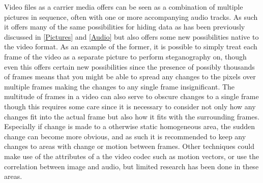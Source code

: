 Video files as a carrier media offers can be seen as a combination of multiple pictures in sequence, often with one or more accompanying audio tracks. As such it offers many of the same possibilities for hiding data as has been previously discussed in \ref{Pictures} and \ref{Audio} but also offers some new possibilities native to the video format. As an example of the former, it is possible to simply treat each frame of the video as a separate picture to perform steganography on, though even this offers certain new possibilities since the presence of possibly thousands of frames means that you might be able to spread any changes to the pixels over multiple frames making the changes to any single frame insignificant. The multitude of frames in a video can also serve to obscure changes to a single frame though this requires some care since it is necessary to consider not only how any changes fit into the actual frame but also how it fits with the surrounding frames. Especially if change is made to a otherwise static homogeneous area, the sudden change can become more obvious, and as such it is recommended to keep any changes to areas with change or motion between frames.
Other techniques could make use of the attributes of a the video codec such as motion vectors, or use the correlation between image and audio, but limited research has been done in these areas.
